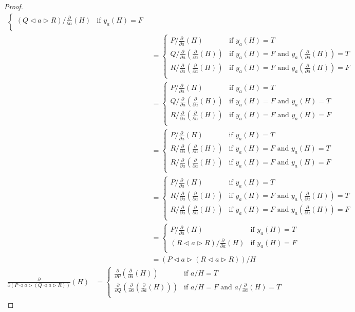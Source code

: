 \documentclass[a4paper,twoside,openright]{report}
\newcommand{\dd}[1]{\frac{\partial}{\partial #1}}
\newcommand{\lef}{\ensuremath{\triangleleft}}
\newcommand{\rig}{\ensuremath{\triangleright}}
\begin{document}
\begin{proof}
\begin{align*}
\begin{cases}
(Q\lef a\rig R)/\dd a(H) & \text{if $y_a(H)=F$}\\
\end{cases}\\
&=\begin{cases}
P/\dd a(H) & \text{if $y_a(H)=T$}\\
Q/\dd a(\dd a(H)) & \text{if $y_a(H)=F$ and $y_a(\dd a(H))=T$}\\
R/\dd a(\dd a(H)) & \text{if $y_a(H)=F$ and $y_a(\dd a(H))=F$}\\
\end{cases}\\
&=\begin{cases}
P/\dd a(H) & \text{if $y_a(H)=T$}\\
Q/\dd a(\dd a(H)) & \text{if $y_a(H)=F$ and $y_a(H)=T$}\\
R/\dd a(\dd a(H)) & \text{if $y_a(H)=F$ and $y_a(H)=F$}\\
\end{cases}\\
&=\begin{cases}
P/\dd a(H) & \text{if $y_a(H)=T$}\\
R/\dd a(\dd a(H)) & \text{if $y_a(H)=F$ and $y_a(H)=T$}\\
R/\dd a(\dd a(H)) & \text{if $y_a(H)=F$ and $y_a(H)=F$}\\
\end{cases}\\
&=\begin{cases}
P/\dd a(H) & \text{if $y_a(H)=T$}\\
R/\dd a(\dd a(H)) & \text{if $y_a(H)=F$ and $y_a(\dd a(H))=T$}\\
R/\dd a(\dd a(H)) & \text{if $y_a(H)=F$ and $y_a(\dd a(H))=F$}\\
\end{cases}\\
&=\begin{cases}
P/\dd a(H) & \text{if $y_a(H)=T$}\\
(R\lef a\rig R)/\dd a(H) & \text{if $y_a(H)=F$}\\
\end{cases}\\
&=(P\lef a\rig (R\lef a\rig R))/H
\end{align*}
\begin{align*}
\dd{(P\lef a\rig(Q\lef a\rig R))}(H)
&=\begin{cases}
\dd P(\dd a(H)) & \text{if $a/H=T$}\\
\dd Q(\dd a(\dd a(H))) & \text{if $a/H=F$ and $a/\dd a(H)=T$}\\

\end{cases}
\end{align*}
\end{proof}
\end{document}
